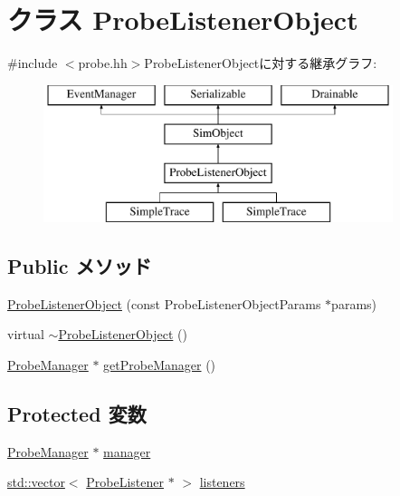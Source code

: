 \hypertarget{classProbeListenerObject}{
\section{クラス ProbeListenerObject}
\label{classProbeListenerObject}
}


{\ttfamily \#include $<$probe.hh$>$}ProbeListenerObjectに対する継承グラフ:\begin{figure}[H]
\begin{center}
\leavevmode
\includegraphics[height=4cm]{classProbeListenerObject}
\end{center}
\end{figure}
\subsection*{Public メソッド}
\begin{DoxyCompactItemize}
\item 
\hyperlink{classProbeListenerObject_a7f3ac1c92134f0c44bf10a9905fed190}{ProbeListenerObject} (const ProbeListenerObjectParams $\ast$params)
\item 
virtual \hyperlink{classProbeListenerObject_afd077e0d2cf6c6d5d6c310fed424bd18}{$\sim$ProbeListenerObject} ()
\item 
\hyperlink{classProbeManager}{ProbeManager} $\ast$ \hyperlink{classProbeListenerObject_a4cdf821c3b87d8c0440d271b602fcdb5}{getProbeManager} ()
\end{DoxyCompactItemize}
\subsection*{Protected 変数}
\begin{DoxyCompactItemize}
\item 
\hyperlink{classProbeManager}{ProbeManager} $\ast$ \hyperlink{classProbeListenerObject_ab41bb1945c343464666bb792599747c2}{manager}
\item 
\hyperlink{classstd_1_1vector}{std::vector}$<$ \hyperlink{classProbeListener}{ProbeListener} $\ast$ $>$ \hyperlink{classProbeListenerObject_a86ce4804fd801153a4a7dd78761958ab}{listeners}
\end{DoxyCompactItemize}


